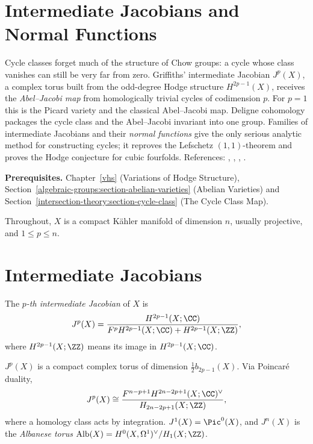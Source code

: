 \section{Intermediate Jacobians and Normal Functions}\label{vhs:section-intermediate-jacobians}
Cycle classes forget much of the structure of Chow groups: a cycle whose class vanishes can still be very far from zero. Griffiths' intermediate Jacobian
$J^p(X)$, a complex torus built from the odd-degree Hodge structure $H^{2p-1}(X)$, receives the \emph{Abel--Jacobi map} from homologically trivial cycles of
codimension $p$. For $p = 1$ this is the Picard variety and the classical Abel--Jacobi map. Deligne cohomology packages the cycle class and the Abel--Jacobi
invariant into one group. Families of intermediate Jacobians and their \emph{normal functions} give the only serious analytic method for constructing cycles; it
reproves the Lefschetz $(1,1)$-theorem and proves the Hodge conjecture for cubic fourfolds. References: \cite[Chapter 12]{voisin-hodge-1}, \cite{voisin-hodge-2},
\cite{griffiths-periods}, \cite{carlson-muller-stach-peters}.

\noindent\textbf{Prerequisites.} Chapter~\ref{vhs} (Variations of Hodge Structure), Section~\ref{algebraic-groups:section-abelian-varieties} (Abelian Varieties) and Section~\ref{intersection-theory:section-cycle-class}
(The Cycle Class Map).

Throughout, $X$ is a compact K\"ahler manifold of dimension $n$, usually projective, and $1 \leq p \leq n$.

\section{Intermediate Jacobians}\label{vhs:section-definition}

\begin{definition}\label{vhs:definition-intermediate-jacobian}
The \emph{$p$-th intermediate Jacobian} of $X$ is
\[
J^p(X) = \frac{H^{2p-1}(X; \CC)}{F^pH^{2p-1}(X; \CC) + H^{2p-1}(X; \ZZ)} ,
\]
where $H^{2p-1}(X; \ZZ)$ means its image in $H^{2p-1}(X; \CC)$.
\end{definition}

\begin{proposition}\label{vhs:proposition-torus}
$J^p(X)$ is a compact complex torus of dimension $\frac12b_{2p-1}(X)$. Via Poincar\'e duality,
\[
J^p(X) \cong \frac{F^{n-p+1}H^{2n-2p+1}(X; \CC)^\vee}{H_{2n-2p+1}(X; \ZZ)} ,
\]
where a homology class acts by integration. $J^1(X) = \Pic^0(X)$, and $J^n(X)$ is the \emph{Albanese torus} $\mathrm{Alb}(X) = H^0(X, \Omega^1)^\vee/H_1(X; \ZZ)$.
\end{proposition}

